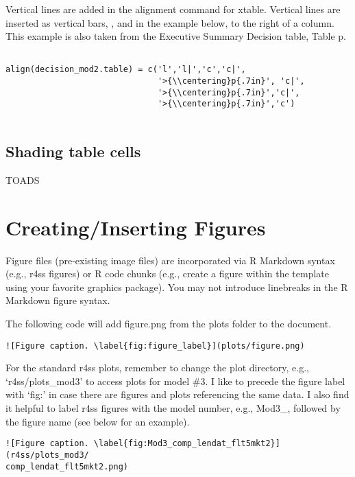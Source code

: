 \documentclass[12pt,]{article}
\begin{document}
Vertical lines are added in the alignment command for xtable. Vertical
lines are inserted as vertical bars, \textbar{}, and in the example
below, to the right of a column. This example is also taken from the
Executive Summary Decision table, Table p.

\begin{Verbatim}[frame=single]

align(decision_mod2.table) = c('l','l|','c','c|',
                               '>{\\centering}p{.7in}', 'c|',
                               '>{\\centering}p{.7in}','c|',
                               '>{\\centering}p{.7in}','c') 
                               
\end{Verbatim}

\subsection{Shading table cells}\label{shading-table-cells}

TOADS

\section{Creating/Inserting Figures}\label{creatinginserting-figures}

Figure files (pre-existing image files) are incorporated via R Markdown
syntax (e.g., r4ss figures) or R code chunks (e.g., create a figure
within the template using your favorite graphics package). You may not
introduce linebreaks in the R Markdown figure syntax.

The following code will add figure.png from the plots folder to the
document.

\begin{Verbatim}[frame=single]
![Figure caption. \label{fig:figure_label}](plots/figure.png)
\end{Verbatim}

For the standard r4ss plots, remember to change the plot directory,
e.g., `r4ss/plots\_mod3' to access plots for model \#3. I like to
precede the figure label with `fig:' in case there are figures and plots
referencing the same data. I also find it helpful to label r4ss figures
with the model number, e.g., Mod3\_, followed by the figure name (see
below for an example).

\begin{Verbatim}[frame=single]
![Figure caption. \label{fig:Mod3_comp_lendat_flt5mkt2}](r4ss/plots_mod3/
comp_lendat_flt5mkt2.png)
\end{Verbatim}
\end{document}
